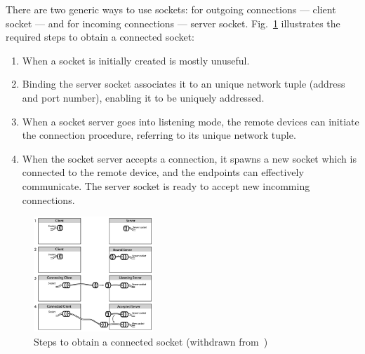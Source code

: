 There are two generic ways to use sockets: for outgoing connections --- client
socket --- and for incoming connections --- server
socket. Fig.~\ref{fig:sockets-connection} illustrates the required steps to
obtain a connected socket:
\begin{enumerate}
\item When a socket is initially created is mostly unuseful.
\item Binding the server socket associates it to an unique network tuple (address and
  port number), enabling it to be uniquely addressed.
\item When a socket server goes into listening mode, the remote devices can
  initiate the connection procedure, referring to its unique network tuple.
\item When the socket server accepts a connection, it spawns a new socket which
  is connected to the remote device, and the endpoints can effectively
  communicate. The server socket is ready to accept new incomming connections.
\end{enumerate}
\begin{figure}[!hbt]
\centering
    \includegraphics[width=0.4\textwidth]{./img/sockets-connection.png}
  \caption{Steps to obtain a connected socket (withdrawn from~\cite{huang2007bluetooth})}%
\label{fig:sockets-connection}
\end{figure}
%
